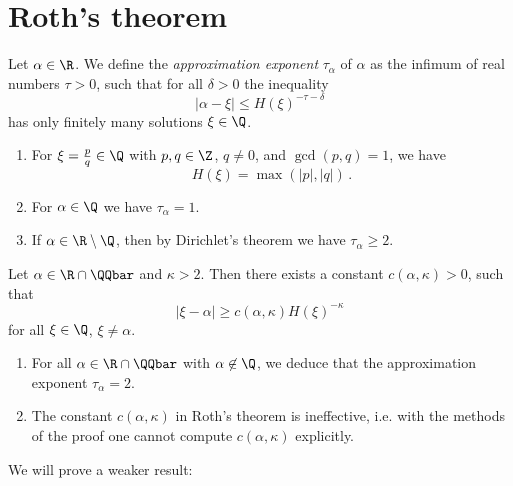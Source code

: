 \section{Roth's theorem}

\begin{defn*} 
	Let \( \alpha \in \R \).
	We define the \emph{approximation exponent} \( \tau_\alpha \) of \( \alpha \) as the infimum of real numbers \( \tau>0 \), such that for all \( \delta > 0 \) the inequality
	\[ |\alpha - \xi| \leq H(\xi)^{-\tau-\delta} \]
	has only finitely many solutions \( \xi \in \Q \).
\end{defn*}

\begin{rem*}
	\begin{enumerate}[label=\alph*)]
		\item For \( \xi = \frac{p}{q} \in \Q \) with \( p,q \in \Z \), \( q \neq 0 \), and \( \gcd(p,q) = 1 \), we have
			\[ H(\xi) = \max(|p|, |q|) \,. \]
		\item For \( \alpha \in \Q \) we have \( \tau_\alpha = 1 \).
		\item If \( \alpha \in \R\setminus \Q \), then by Dirichlet's theorem we have \( \tau_\alpha \geq 2 \).
	\end{enumerate}
\end{rem*}

\begin{thm*}[Roth, 1955] 
	Let \( \alpha \in \R \cap \QQbar \) and \( \kappa > 2 \).
	Then there exists a constant \( c(\alpha, \kappa) > 0 \), such that
	\[ |\xi - \alpha| \geq c(\alpha, \kappa) H(\xi)^{-\kappa} \]
	for all \( \xi \in \Q \), \( \xi \neq \alpha \).
\end{thm*}

\begin{rem*}
	\begin{enumerate}[label=\alph*)]
		\item For all \( \alpha \in \R \cap \QQbar \) with \( \alpha \not\in \Q \), we deduce that the approximation exponent \( \tau_\alpha = 2 \).
		\item The constant \( c(\alpha, \kappa) \) in Roth's theorem is ineffective, i.e. with the methods of the proof one cannot compute \( c(\alpha, \kappa) \) explicitly.
	\end{enumerate}
\end{rem*}

We will prove a weaker result:

